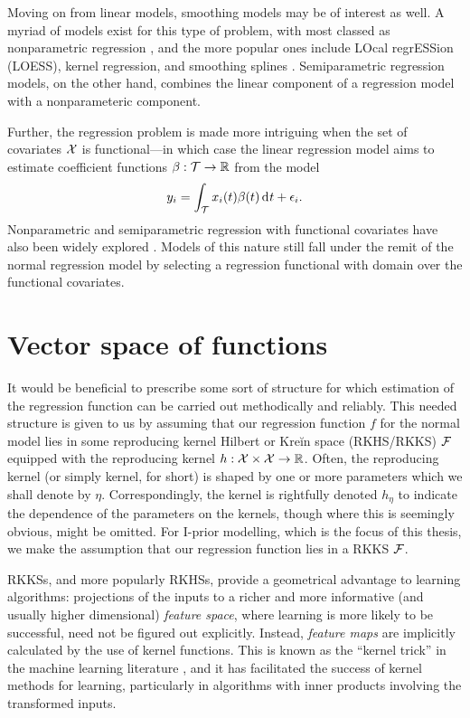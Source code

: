 \documentclass[11pt,twoside,openright,showframe]{report}
\begin{document}
Moving on from linear models, smoothing models may be of interest as well.
A myriad of models exist for this type of problem, with most classed as nonparametric regression \citep{wassermann2006all}, and the more popular ones include LOcal regrESSion (LOESS), kernel regression, and smoothing splines \citep{wahba1990spline}.
Semiparametric regression models, on the other hand, combines the linear component of a regression model with a nonparameteric component.

Further, the regression problem is made more intriguing when the set of covariates ${\mathcal X}$ is functional---in which case the linear regression model aims to estimate coefficient functions $\beta:{\mathcal T} \to \mathbb{R}$ from the model
\[
  y_i = \int_{\mathcal T} x_i(t)\beta(t) \operatorname{d}\hspace{0.5pt}\! t + \epsilon_i.
\]
Nonparametric and semiparametric regression with functional covariates have also been widely explored \citep{ramsay2005functional}.
Models of this nature still fall under the remit of the normal regression model by selecting a regression functional with domain over the functional covariates.

\section{Vector space of functions}

It would be beneficial to prescribe some sort of structure for which estimation of the regression function can be carried out methodically and reliably. 
This needed structure is given to us by assuming that our regression function $f$ for the normal model lies in some reproducing kernel Hilbert or Kreĭn space (RKHS/RKKS) ${\mathcal F}$ equipped with the reproducing kernel $h:{\mathcal X} \times {\mathcal X} \to \mathbb{R}$.
Often, the reproducing kernel (or simply kernel, for short) is shaped by one or more parameters which we shall denote by $\eta$.
Correspondingly, the kernel is rightfully denoted $h_\eta$ to indicate the dependence of the parameters on the kernels, though where this is seemingly obvious, might be omitted.
For I-prior modelling, which is the focus of this thesis, we make the assumption that our regression function lies in a RKKS ${\mathcal F}$.

RKKSs, and more popularly RKHSs, provide a geometrical advantage to learning algorithms: projections of the inputs to a richer and more informative (and usually higher dimensional) \emph{feature space}, where learning is more likely to be successful, need not be figured out explicitly.
Instead, \emph{feature maps} are implicitly calculated by the use of kernel functions. 
This is known as the ``kernel trick'' in the machine learning literature \citep{hofmann2008kernel}, and it has facilitated the success of kernel methods for learning, particularly in algorithms with inner products involving the transformed inputs. 
\end{document}
